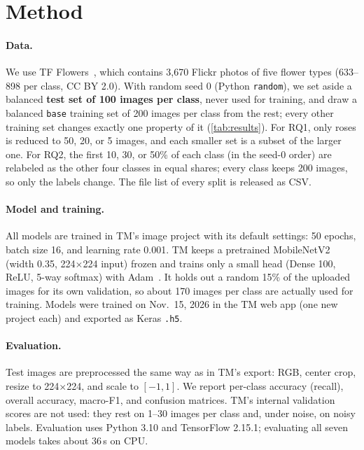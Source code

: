 \section{Method}
\label{sec:method}

\paragraph{Data.}
We use TF Flowers~\cite{tfflowers}, which contains 3,670 Flickr photos of five flower types
(633--898 per class, CC BY 2.0).
With random seed 0 (Python \texttt{random}), we set aside a balanced \textbf{test set of 100 images per class},
never used for training, and draw a balanced \texttt{base} training set of 200 images per class from the rest;
every other training set changes exactly one property of it (\cref{tab:results}).
For RQ1, only roses is reduced to 50, 20, or 5 images, and each smaller set is a subset of the larger one.
For RQ2, the first 10, 30, or 50\% of each class (in the seed-0 order) are relabeled as the other four classes in
equal shares; every class keeps 200 images, so only the labels change.
The file list of every split is released as CSV.

\paragraph{Model and training.}
All models are trained in TM's image project with its default settings: 50 epochs, batch size 16, and learning
rate 0.001.
TM keeps a pretrained MobileNetV2~\cite{sandler2018mobilenetv2} (width 0.35, 224$\times$224 input) frozen and
trains only a small head (Dense 100, ReLU, 5-way softmax) with Adam~\cite{kingma2015adam}.
It holds out a random 15\% of the uploaded images for its own validation, so about 170 images per class are
actually used for training.
Models were trained on Nov.~15, 2026 in the TM web app (one new project each) and exported as Keras \texttt{.h5}.

\paragraph{Evaluation.}
Test images are preprocessed the same way as in TM's export: RGB, center crop, resize to 224$\times$224,
and scale to $[-1,1]$.
We report per-class accuracy (recall), overall accuracy, macro-F1, and confusion matrices.
TM's internal validation scores are not used: they rest on 1--30 images per class and, under noise, on noisy labels.
Evaluation uses Python 3.10 and TensorFlow 2.15.1; evaluating all seven models takes about 36\,s on CPU.
